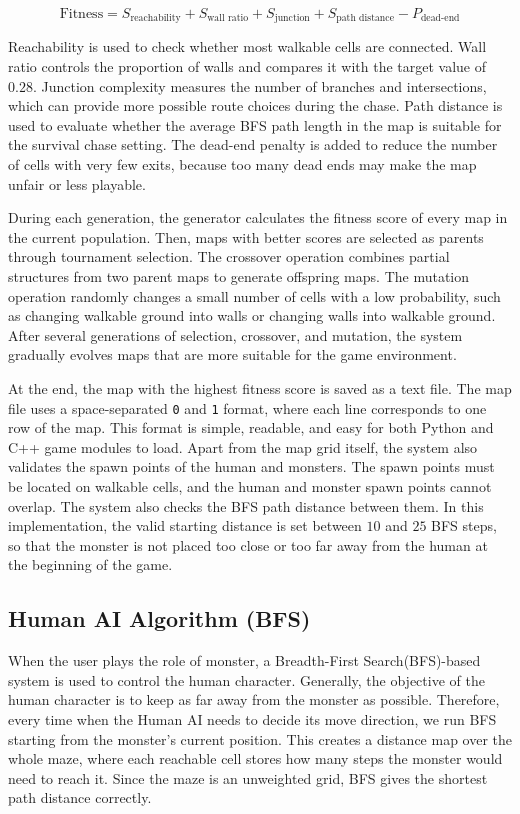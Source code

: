 \documentclass[12pt,a4paper]{article}
\begin{document}
\begin{equation}
\text{Fitness} =
S_{\text{reachability}}
+ S_{\text{wall ratio}}
+ S_{\text{junction}}
+ S_{\text{path distance}}
- P_{\text{dead-end}}
\end{equation}

Reachability is used to check whether most walkable cells are connected. Wall ratio controls the proportion of walls and compares it with the target value of $0.28$. Junction complexity measures the number of branches and intersections, which can provide more possible route choices during the chase. Path distance is used to evaluate whether the average BFS path length in the map is suitable for the survival chase setting. The dead-end penalty is added to reduce the number of cells with very few exits, because too many dead ends may make the map unfair or less playable.

During each generation, the generator calculates the fitness score of every map in the current population. Then, maps with better scores are selected as parents through tournament selection. The crossover operation combines partial structures from two parent maps to generate offspring maps. The mutation operation randomly changes a small number of cells with a low probability, such as changing walkable ground into walls or changing walls into walkable ground. After several generations of selection, crossover, and mutation, the system gradually evolves maps that are more suitable for the game environment.

At the end, the map with the highest fitness score is saved as a text file. The map file uses a space-separated \texttt{0} and \texttt{1} format, where each line corresponds to one row of the map. This format is simple, readable, and easy for both Python and C++ game modules to load. Apart from the map grid itself, the system also validates the spawn points of the human and monsters. The spawn points must be located on walkable cells, and the human and monster spawn points cannot overlap. The system also checks the BFS path distance between them. In this implementation, the valid starting distance is set between $10$ and $25$ BFS steps, so that the monster is not placed too close or too far away from the human at the beginning of the game.

\subsection{Human AI Algorithm (BFS)}

When the user plays the role of monster, 
a Breadth-First Search(BFS)-based system is used to control the human character. 
Generally, the objective of the human character is to keep as far away from the monster as possible.
Therefore, every time when the Human AI needs to decide its move direction,
we run BFS starting from the monster's current position.
This creates a distance map over the whole maze, 
where each reachable cell stores how many steps the monster would need to reach it.
Since the maze is an unweighted grid, BFS gives the shortest path distance correctly.
\end{document}
